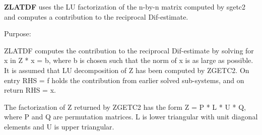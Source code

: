 {\bfseries Z\+L\+A\+T\+D\+F} uses the L\+U factorization of the n-\/by-\/n matrix computed by sgetc2 and computes a contribution to the reciprocal Dif-\/estimate. 

 \begin{DoxyParagraph}{Purpose\+: }
\begin{DoxyVerb} ZLATDF computes the contribution to the reciprocal Dif-estimate
 by solving for x in Z * x = b, where b is chosen such that the norm
 of x is as large as possible. It is assumed that LU decomposition
 of Z has been computed by ZGETC2. On entry RHS = f holds the
 contribution from earlier solved sub-systems, and on return RHS = x.

 The factorization of Z returned by ZGETC2 has the form
 Z = P * L * U * Q, where P and Q are permutation matrices. L is lower
 triangular with unit diagonal elements and U is upper triangular.\end{DoxyVerb}
 
\end{DoxyParagraph}

